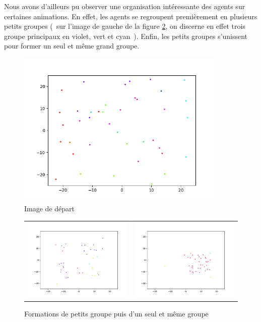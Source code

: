 \documentclass[french, a4paper, 12pt, openany]{report}
\begin{document}
   Nous avons d'ailleurs pu observer une organisation intéressante des agents sur certaines animations. En effet, les agents se regroupent premièrement en plusieurs petits groupes (~sur l'image de gauche de la figure \ref{mouvement_grp2}, on discerne en effet trois groupe principaux en violet, vert et cyan~). Enfin, les petits groupes s'unissent pour former un seul et même grand groupe.
   
    \begin{figure}[!h]
		\centering
		\includegraphics[width=10cm]{images/image_8.png}
		\caption{Image de départ }
		\label{mouvement_grp}
	\end{figure} 
	
   \begin{figure}[!h]
		\centering
		\begin{tabular}{cc}
			\includegraphics[width=8cm]{images/image_7.png} & \includegraphics[width=8cm]{images/image_9.png} \\
		\end{tabular}
		\caption{Formations de petits groupe puis d'un seul et même groupe}
		\label{mouvement_grp2}
	\end{figure} 
	
\end{document}
